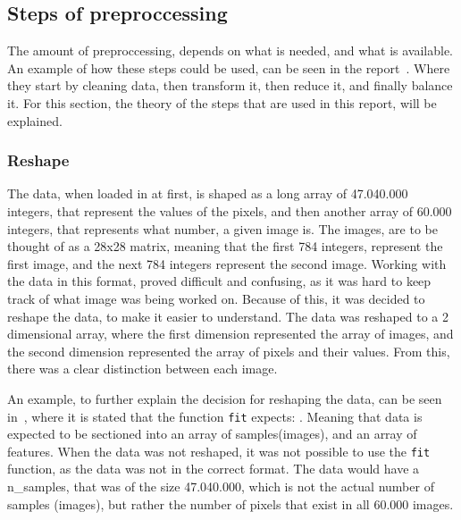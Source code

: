   
  
\subsection{Steps of preproccessing}\label{subsec:preprocessing-steps}
The amount of preproccessing, depends on what is needed, and what is available. An example of how these steps could be used, can be seen in the report~\cite{Data-preprocessing-for-flight-delays}. Where they start by cleaning data, then transform it, then reduce it, and finally balance it. For this section, the theory of the steps that are used in this report, will be explained.

  

\subsubsection{Reshape}\label{subsec:preprocessing-reshape}
The data, when loaded in at first, is shaped as a long array of 47.040.000 integers, that represent the values of the pixels, and then another array of 60.000 integers, that represents what number, a given image is. The images, are to be thought of as a 28x28 matrix, meaning that the first 784 integers, represent the first image, and the next 784 integers represent the second image. Working with the data in this format, proved difficult and confusing, as it was hard to keep track of what image was being worked on. Because of this, it was decided to reshape the data, to make it easier to understand. The data was reshaped to a 2 dimensional array, where the first dimension represented the array of images, and the second dimension represented the array of pixels and their values. From this, there was a clear distinction between each image.

  
An example, to further explain the decision for reshaping the data, can be seen in~\cite{scikit-learn-PCA}, where it is stated that the function \texttt{fit} expects: . Meaning that data is expected to be sectioned into an array of samples(images), and an array of features. When the data was not reshaped, it was not possible to use the \texttt{fit} function, as the data was not in the correct format. The data would have a n\_samples, that was of the size 47.040.000, which is not the actual number of samples (images), but rather the number of pixels that exist in all 60.000 images.




